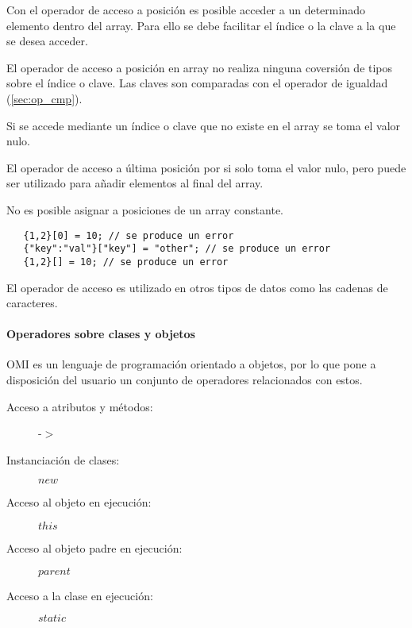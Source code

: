 Con el operador de acceso a posición es posible acceder a un determinado elemento
dentro del array. Para ello se debe facilitar el índice o la clave a la que 
se desea acceder. 

El operador de acceso a posición en array no realiza ninguna coversión de tipos sobre 
el índice o clave. Las claves son comparadas con el operador de igualdad (\autoref{sec:op_cmp}).

Si se accede mediante un índice o clave que no existe en el array se toma el valor nulo.

El operador de acceso a última posición por si solo toma el valor nulo, pero puede ser utilizado 
para añadir elementos al final del array. 

No es posible asignar a posiciones de un array constante. \\

\begin{lstlisting}
   {1,2}[0] = 10; // se produce un error
   {"key":"val"}["key"] = "other"; // se produce un error
   {1,2}[] = 10; // se produce un error
\end{lstlisting} 

El operador de acceso es utilizado en otros tipos de datos como las cadenas
de caracteres.


\paragraph{Operadores sobre clases y objetos} \label{sec:op_object}

OMI es un lenguaje de programación orientado a objetos, por lo que pone a 
disposición del usuario un conjunto de operadores relacionados con estos. \\

\begin{description}
\item [Acceso a atributos y métodos:] -$>$
\item [Instanciación de clases:] $new$
\item [Acceso al objeto en ejecución:] $this$ 
\item [Acceso al objeto padre en ejecución:] $parent$ 
\item [Acceso a la clase en ejecución:] $static$ 
\end{description} 

